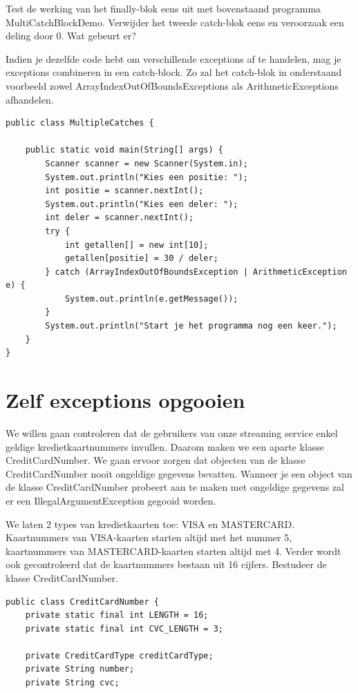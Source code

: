 \begin{itemize}
{\begin{oefening}
Test de werking van het finally-blok eens uit met bovenstaand programma MultiCatchBlockDemo. Verwijder het tweede catch-blok eens en veroorzaak een deling door 0. Wat gebeurt er?
\end{oefening}

Indien je dezelfde code hebt om verschillende exceptions af te handelen, mag je exceptions combineren in een catch-block. Zo zal het catch-blok in onderstaand voorbeeld zowel ArrayIndexOutOfBoundsExceptions als ArithmeticExceptions afhandelen.

\begin{lstlisting}
public class MultipleCatches {

	public static void main(String[] args) {
		Scanner scanner = new Scanner(System.in);
		System.out.println("Kies een positie: ");
		int positie = scanner.nextInt();
		System.out.println("Kies een deler: ");
		int deler = scanner.nextInt();
		try {
			int getallen[] = new int[10];
			getallen[positie] = 30 / deler;
		} catch (ArrayIndexOutOfBoundsException | ArithmeticException e) {
			System.out.println(e.getMessage());
		}
		System.out.println("Start je het programma nog een keer.");
	}
}
\end{lstlisting}

\section{Zelf exceptions opgooien}
We willen gaan controleren dat de gebruikers van onze streaming service enkel geldige kredietkaartnummers invullen. Daarom maken we een aparte klasse CreditCardNumber. We gaan ervoor zorgen dat objecten van de klasse CreditCardNumber nooit ongeldige gegevens bevatten. Wanneer je een object van de klasse CreditCardNumber probeert aan te maken met ongeldige gegevens zal er een IllegalArgumentException gegooid worden.

We laten 2 types van kredietkaarten toe: VISA en MASTERCARD. Kaartnummers van VISA-kaarten starten altijd met het nummer 5, kaartnummers van MASTERCARD-kaarten starten altijd met 4.
Verder wordt ook gecontroleerd dat de kaartnummers bestaan uit 16 cijfers. Bestudeer de klasse CreditCardNumber.

\begin{lstlisting}
public class CreditCardNumber {
	private static final int LENGTH = 16;
	private static final int CVC_LENGTH = 3;

	private CreditCardType creditCardType;
	private String number;
	private String cvc;


\end{lstlisting}}
\end{itemize}
